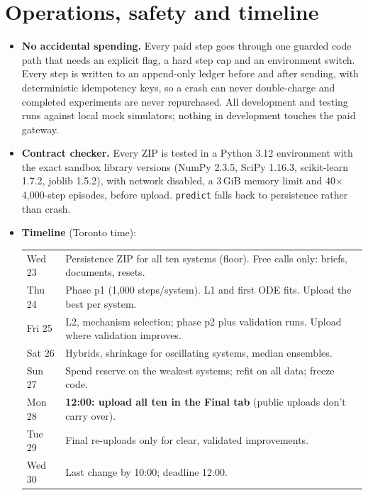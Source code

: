 \documentclass[11pt]{article}
\theoremstyle{plain}
\theoremstyle{definition}
\theoremstyle{remark}
\begin{document}
\section{Operations, safety and timeline}
\begin{itemize}
\item \textbf{No accidental spending.} Every paid step goes through one guarded code path that needs an explicit flag, a hard step cap and an environment switch. Every step is written to an append-only ledger before and after sending, with deterministic idempotency keys, so a crash can never double-charge and completed experiments are never repurchased. All development and testing runs against local mock simulators; nothing in development touches the paid gateway.
\item \textbf{Contract checker.} Every ZIP is tested in a Python 3.12 environment with the exact sandbox library versions (NumPy 2.3.5, SciPy 1.16.3, scikit-learn 1.7.2, joblib 1.5.2), with network disabled, a 3\,GiB memory limit and 40$\times$4,000-step episodes, before upload. \texttt{predict} falls back to persistence rather than crash.
\item \textbf{Timeline} (Toronto time):
\begin{center}
\small
\begin{tabular}{@{}lp{12.4cm}@{}}
\toprule
Wed 23 & Persistence ZIP for all ten systems (floor). Free calls only: briefs, documents, resets. \\
Thu 24 & Phase p1 (1,000 steps/system). L1 and first ODE fits. Upload the best per system. \\
Fri 25 & L2, mechanism selection; phase p2 plus validation runs. Upload where validation improves. \\
Sat 26 & Hybrids, shrinkage for oscillating systems, median ensembles. \\
Sun 27 & Spend reserve on the weakest systems; refit on all data; freeze code. \\
Mon 28 & \textbf{12:00: upload all ten in the Final tab} (public uploads don't carry over). \\
Tue 29 & Final re-uploads only for clear, validated improvements. \\
Wed 30 & Last change by 10:00; deadline 12:00. \\
\bottomrule
\end{tabular}
\end{center}
\end{itemize}
\end{document}

